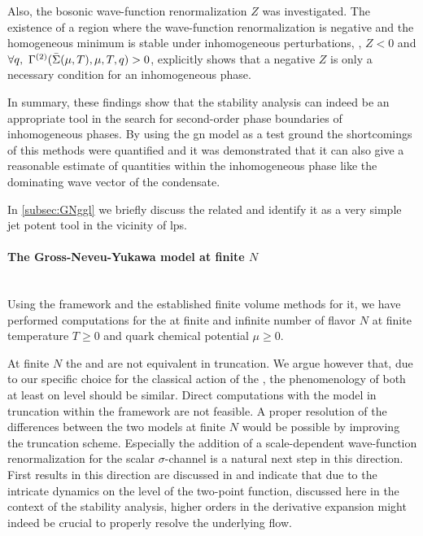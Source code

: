 Also, the bosonic wave-function renormalization $Z$ was investigated.
The existence of a region where the wave-function renormalization is negative and the homogeneous minimum is stable under inhomogeneous perturbations, \ie{}, $Z<0$ and $\forall q, \ \Gamma^{(2)} ( \bar{\Sigma} (\mu, T), \mu, T, q) >0$, explicitly shows that a negative $Z$ is only a necessary condition for an inhomogeneous phase.

In summary, these findings show that the stability analysis can indeed be an appropriate tool in the search for second-order phase boundaries of inhomogeneous phases.
By using the \twoDimensional{} \gls{gn} model as a test ground the shortcomings of this methods were quantified and it was demonstrated that it can also give a reasonable estimate of quantities within the inhomogeneous phase like the dominating wave vector of the condensate.\bigskip

In \cref{subsec:GNggl} we briefly discuss the related \ggla{} and identify it as a very simple jet potent tool in the vicinity of \glspl{lp}.

\paragraph{The Gross-Neveu-Yukawa model at finite \texorpdfstring{$N$}{N}}\label{paragraph:gnConFinN}\mbox{}\\%
Using the \frg{} framework and the established finite volume methods for it, we have performed computations for the \gnym{} at finite and infinite number of flavor $N$ at finite temperature $T\geq0$ and quark chemical potential $\mu\geq0$.\bigskip

At finite $N$ the \gny{} and \gnm{} are not equivalent in \lpa{} truncation. We argue however that, due to our specific choice for the classical action of the \gnym{}, the phenomenology of both at least on \lpa{} level should be similar. Direct computations with the \gn{} model in \lpa{} truncation within the \frg{} framework are not feasible. 
A proper resolution of the differences between the two models at finite $N$ would be possible by improving the truncation scheme. Especially the addition of a scale-dependent wave-function renormalization for the scalar $\sigma$-channel is a natural next step in this direction. First results in this direction are discussed in  and indicate that due to the intricate dynamics on the level of the two-point function, discussed here in the context of the stability analysis, higher orders in the derivative expansion might indeed be crucial to properly resolve the underlying \frg{} flow.

